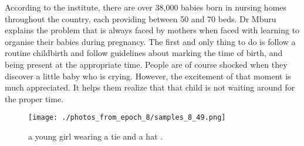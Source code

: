 \documentclass{article}%
\begin{document}
According to the institute, there are over 38,000 babies born in nursing homes throughout the country, each providing between 50 and 70 beds.\newline%
Dr Mburu explains the problem that is always faced by mothers when faced with learning to organise their babies during pregnancy.\newline%
The first and only thing to do is follow a routine childbirth and follow guidelines about marking the time of birth, and being present at the appropriate time.\newline%
People are of course shocked when they discover a little baby who is crying. However, the excitement of that moment is much appreciated. It helps them realize that that child is not waiting around for the proper time.\newline%

%


\begin{figure}[h!]%
\centering%
\texttt{[image: ./photos\_from\_epoch\_8/samples\_8\_49.png]}%
\caption{a young girl wearing a tie and a hat .}%
\end{figure}

%
\end{document}
